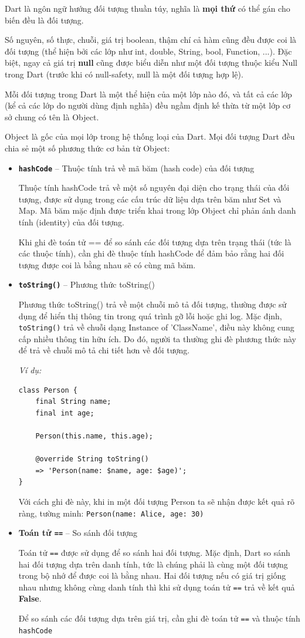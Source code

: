 \documentclass[../DoAn.tex]{subfiles}
\numberwithin{figure}{chapter}
\begin{document}
Dart là ngôn ngữ hướng đối tượng thuần túy, nghĩa là \textbf{mọi thứ} có thể gán cho biến đều là đối tượng.

Số nguyên, số thực, chuỗi, giá trị boolean, thậm chí cả hàm cũng đều được coi là đối tượng (thể hiện bởi các lớp như int, double, String, bool, Function, ...). Đặc biệt, ngay cả giá trị \textbf{null} cũng được biểu diễn như một đối tượng thuộc kiểu Null trong Dart (trước khi có null-safety, null là một đối tượng hợp lệ). 

Mỗi đối tượng trong Dart là một thể hiện của một lớp nào đó, và tất cả các lớp (kể cả các lớp do người dùng định nghĩa) đều ngầm định kế thừa từ một lớp cơ sở chung có tên là Object. 

Object là gốc của mọi lớp trong hệ thống loại của Dart. Mọi đối tượng Dart đều chia sẻ một số phương thức cơ bản từ Object:
\begin{itemize} 
\item \textbf{\texttt{hashCode}} – Thuộc tính trả về mã băm (hash code) của đối tượng 

Thuộc tính hashCode trả về một số nguyên đại diện cho trạng thái của đối tượng, được sử dụng trong các cấu trúc dữ liệu dựa trên băm như Set và Map. Mã băm mặc định được triển khai trong lớp Object chỉ phản ánh danh tính (identity) của đối tượng. 

Khi ghi đè toán tử == để so sánh các đối tượng dựa trên trạng thái (tức là các thuộc tính), cần ghi đè thuộc tính hashCode để đảm bảo rằng hai đối tượng được coi là bằng nhau sẽ có cùng mã băm. 

\item \textbf{\texttt{toString()}} – Phương thức toString() 

Phương thức toString() trả về một chuỗi mô tả đối tượng, thường được sử dụng để hiển thị thông tin trong quá trình gỡ lỗi hoặc ghi log. Mặc định, \texttt{toString()} trả về chuỗi dạng Instance of 'ClassName', điều này không cung cấp nhiều thông tin hữu ích. Do đó, người ta thường ghi đè phương thức này để trả về chuỗi mô tả chi tiết hơn về đối tượng. 

\textit{Ví dụ:}
\begin{lstlisting}
class Person { 
    final String name; 
    final int age;
    
    Person(this.name, this.age);
    
    @override String toString() 
    => 'Person(name: $name, age: $age)'; 
} 
\end{lstlisting}
Với cách ghi đè này, khi in một đối tượng Person ta sẽ nhận được kết quả rõ ràng, tường minh: 
    \texttt{Person(name: Alice, age: 30)}
\item \textbf{Toán tử \texttt{==}} – So sánh đối tượng 

Toán tử \texttt{==} được sử dụng để so sánh hai đối tượng. Mặc định, Dart so sánh hai đối tượng dựa trên danh tính, tức là chúng phải là cùng một đối tượng trong bộ nhớ để được coi là bằng nhau. Hai đối tượng nếu có giá trị giống nhau nhưng không cùng danh tính thì khi sử dụng toán tử \texttt{==} trả về kết quả \textbf{False}. 

Để so sánh các đối tượng dựa trên giá trị, cần ghi đè toán tử \texttt{==} và thuộc tính \texttt{hashCode}
\end{itemize}
\end{document}
